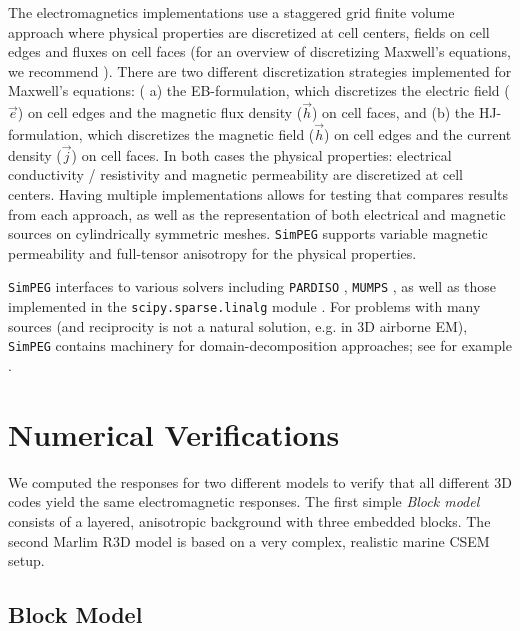\documentclass[
    paper,
  ]{geophysics}
\newcommand{\simpeg}{\texttt{SimPEG}\xspace}
\begin{document}
The electromagnetics implementations use a staggered grid finite volume
approach where physical properties are discretized at cell centers, fields on
cell edges and fluxes on cell faces \citep{IEEE.66.Yee} (for an overview of
discretizing Maxwell's equations, we recommend \cite{Haber2014}). There are
two different discretization strategies implemented for Maxwell's equations: (
a) the EB-formulation, which discretizes the electric field ($\vec{e}$) on
cell edges and the magnetic flux density ($\vec{h}$) on cell faces, and (b)
the HJ-formulation, which discretizes the magnetic field ($\vec{h}$) on cell
edges and the current density ($\vec{j}$) on cell faces. In both cases the
physical properties: electrical conductivity / resistivity and magnetic
permeability are discretized at cell centers. Having multiple implementations
allows for testing that compares results from each approach, as well as the
representation of both electrical and magnetic sources on cylindrically
symmetric meshes. \simpeg supports variable magnetic permeability and
full-tensor anisotropy for the physical properties.


\simpeg interfaces to various solvers including \texttt{PARDISO} \citep{FGCS.04.Schenk}, \texttt{MUMPS} \citep{SIAM.01.Amestoy}, as well as those implemented in the \texttt{scipy.sparse.linalg} module \citep{NM.20.Virtanen}. For problems with many sources (and reciprocity is not a natural solution, e.g. in 3D airborne EM), \simpeg contains machinery for domain-decomposition approaches; see for example \cite{Fournier2020}.


\clearpage  %
\section{Numerical Verifications}

We computed the responses for two different models to verify that all different
3D codes yield the same electromagnetic responses. The first simple \emph{Block
model} consists of a layered, anisotropic background with three embedded
blocks. The second Marlim R3D model is based on a very complex, realistic
marine CSEM setup.

\subsection{Block Model}
\end{document}
